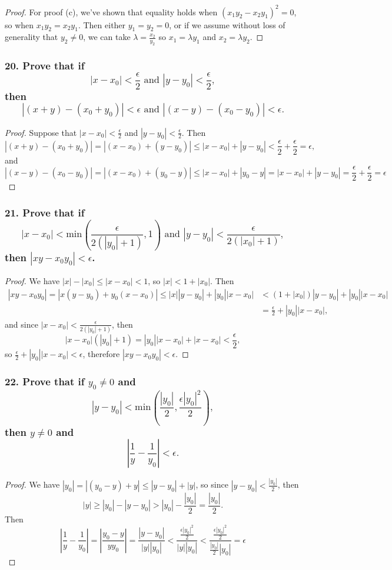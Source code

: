 \documentclass{article}
\begin{document}
\begin{enumerate}
\begin{proof}
		For proof (c), we've shown that equality holds when $(x_1y_2 - x_2y_1)^2 = 0$, so when $x_1y_2 = x_2y_1$. Then either $y_1 = y_2 = 0$, or if we assume without loss of generality that $y_2 \ne 0$, we can take $\lambda = \frac{x_2}{y_2}$ so $x_1 = \lambda y_1$ and $x_2 = \lambda y_2$.
	\end{proof}
\end{enumerate}

\subsubsection*{20. Prove that if \[ |x - x_0| < \frac{\epsilon}{2} \text{ and } |y-y_0| < \frac{\epsilon}{2}, \] then \[ |(x + y) - (x_0 + y_0)| < \epsilon \text{ and } |(x - y) - (x_0 - y_0)| < \epsilon. \]}
\begin{proof}
	Suppose that $|x - x_0| < \frac{\epsilon}{2}$ and $|y - y_0| < \frac{\epsilon}{2}$. Then \[ |(x + y) - (x_0 + y_0)| = |(x - x_0) + (y - y_0)| \le |x - x_0| + |y - y_0| < \frac{\epsilon}{2} + \frac{\epsilon}{2} = \epsilon, \] and \[ |(x - y) - (x_0 - y_0)| = |(x - x_0) + (y_0 - y)| \le |x - x_0| + |y_0 - y| = |x - x_0| + |y - y_0| = \frac{\epsilon}{2} + \frac{\epsilon}{2} = \epsilon \]
\end{proof}

\subsubsection*{21. Prove that if \[ |x - x_0| < \text{min}(\frac{\epsilon}{2(|y_0| + 1)}, 1) \text{ and } |y - y_0| < \frac{\epsilon}{2(|x_0| + 1)}, \] then $|xy - x_0y_0| < \epsilon$.}
\begin{proof}
	We have $|x| - |x_0| \le |x - x_0| < 1$, so $|x| < 1 + |x_0|$. Then
	\begin{align*}
		|xy - x_0y_0| = |x(y - y_0) + y_0(x - x_0)| \le |x||y - y_0| + |y_0||x - x_0| &< (1 + |x_0|)|y - y_0| + |y_0||x - x_0| \\&= \frac{\epsilon}{2} + |y_0||x - x_0|,
	\end{align*}
	and since $|x - x_0| < \frac{\epsilon}{2(|y_0| + 1)}$, then \[ |x - x_0|(|y_0| + 1) = |y_0||x-x_0| + |x -x_0| < \frac{\epsilon}{2}, \] so $\frac{\epsilon}{2} + |y_0||x - x_0| < \epsilon$, therefore $|xy - x_0y_0| < \epsilon$. 
\end{proof}

\subsubsection*{22. Prove that if $y_0 \ne 0$ and \[ |y - y_0| < \text{min}(\frac{|y_0|}{2}, \frac{\epsilon|y_0|^2}{2}), \] then $y \ne 0$ and \[ |\frac{1}{y} - \frac{1}{y_0}| < \epsilon. \]}
\begin{proof}
	We have $|y_0| = |(y_0 - y) + y| \le |y - y_0| + |y|$, so since $|y - y_0| < \frac{|y_0|}{2}$, then \[ |y| \ge |y_0| - |y - y_0| > |y_0| - \frac{|y_0|}{2} = \frac{|y_0|}{2}. \] Then \[ \left|\frac{1}{y} - \frac{1}{y_0}\right| = \left|\frac{y_0 - y}{yy_0}\right| = \frac{|y - y_0|}{|y||y_0|} < \frac{\frac{\epsilon|y_0|^2}{2}}{|y||y_0|} < \frac{\frac{\epsilon|y_0|^2}{2}}{\frac{|y_0|}{2}|y_0|} = \epsilon \]
\end{proof}
\pagebreak
\end{document}
